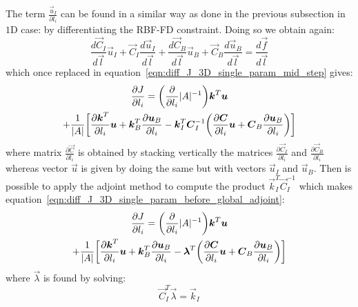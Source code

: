 The term $\frac{\vec{u}_I}{\partial l_i}$ can be found in a similar way as done in the previous subsection in $1$D case: by differentiating the RBF-FD constraint. Doing so we obtain again:
\begin{equation}
	\frac{d\vec{C}_I}{d\vec{l}} \vec{u}_I + \vec{C}_I \frac{d\vec{u}_I}{d\vec{l}} + \frac{d\vec{C}_B}{d\vec{l}} \vec{u}_B + \vec{C}_B \frac{d\vec{u}_B}{d\vec{l}} =
	\frac{d\vec{f}}{d\vec{l}}
\end{equation}
which once replaced in equation~\eqref{eqn:diff_J_3D_single_param_mid_step} gives:
\begin{multline}
	\label{eqn:diff_J_3D_single_param_before_global_adjoint}
	\frac{\partial J}{\partial l_i} = \biggl( \frac{\partial}{\partial l_i} \lvert A\rvert^{-1} \biggr) \boldsymbol{k}^T \boldsymbol{u} \\ + \frac{1}{\lvert A\rvert} \biggl[ \frac{\partial \boldsymbol{k}^T}{\partial l_i}\boldsymbol{u} + \boldsymbol{k}_B^T \frac{\partial \boldsymbol{u}_B}{\partial l_i} - \boldsymbol{k}_I^T \boldsymbol{C}_I^{-1} \biggl( \frac{\partial \boldsymbol{C}}{\partial l_i}\boldsymbol{u} + \boldsymbol{C}_B\frac{\partial \boldsymbol{u}_B}{\partial l_i}\biggr) \biggr]
\end{multline}
where matrix $\frac{\partial \vec{C}}{\partial l_i}$ is obtained by stacking vertically the matrices $\frac{\partial \vec{C}_I}{\partial l_i}$ and $\frac{\partial \vec{C}_B}{\partial l_i}$ whereas vector $\vec{u}$ is given by doing the same but with vectors $\vec{u}_I$ and $\vec{u}_B$.
Then is possible to apply the adjoint method to compute the product $\vec{k}_I^T \vec{C}_I^{-1}$ which makes equation~\eqref{eqn:diff_J_3D_single_param_before_global_adjoint}:
\begin{multline}
	\label{eqn:diff_J_3D_single_param_after_global_adjoint}
	\frac{\partial J}{\partial l_i} = \biggl( \frac{\partial}{\partial l_i} \lvert A\rvert^{-1} \biggr) \boldsymbol{k}^T \boldsymbol{u} \\ + \frac{1}{\lvert A\rvert} \biggl[ \frac{\partial \boldsymbol{k}^T}{\partial l_i}\boldsymbol{u} + \boldsymbol{k}_B^T \frac{\partial \boldsymbol{u}_B}{\partial l_i} - \boldsymbol{\lambda}^T \biggl( \frac{\partial \boldsymbol{C}}{\partial l_i}\boldsymbol{u} + \boldsymbol{C}_B\frac{\partial \boldsymbol{u}_B}{\partial l_i}\biggr) \biggr]
\end{multline}
where $\vec{\lambda}$ is found by solving:
\begin{equation}
	\vec{C}_I^T \vec{\lambda} = \vec{k}_I
\end{equation}


